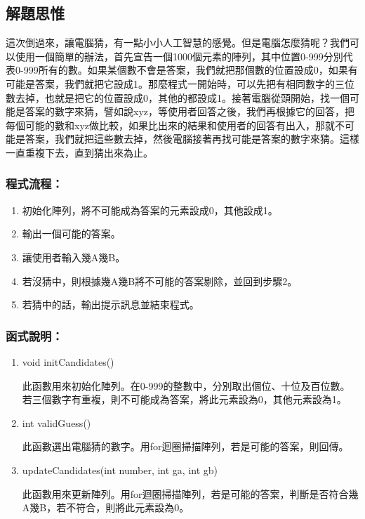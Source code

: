 \documentclass[12pt,a4paper]{article}
\begin{document}
\subsection{解題思惟}
這次倒過來，讓電腦猜，有一點小小人工智慧的感覺。但是電腦怎麼猜呢？我們可以使用一個簡單的辦法，首先宣告一個1000個元素的陣列，其中位置0-999分別代表0-999所有的數。如果某個數不會是答案，我們就把那個數的位置設成0，如果有可能是答案，我們就把它設成1。那麼程式一開始時，可以先把有相同數字的三位數去掉，也就是把它的位置設成0，其他的都設成1。接著電腦從頭開始，找一個可能是答案的數字來猜，譬如說xyz，等使用者回答之後，我們再根據它的回答，把每個可能的數和xyz做比較，如果比出來的結果和使用者的回答有出入，那就不可能是答案，我們就把這些數去掉，然後電腦接著再找可能是答案的數字來猜。這樣一直重複下去，直到猜出來為止。
\subsubsection{程式流程：}
\begin{enumerate}
	\item 初始化陣列，將不可能成為答案的元素設成0，其他設成1。
	\item 輸出一個可能的答案。
	\item 讓使用者輸入幾A幾B。
	\item 若沒猜中，則根據幾A幾B將不可能的答案剔除，並回到步驟2。
	\item 若猜中的話，輸出提示訊息並結束程式。
\end{enumerate}

\subsubsection{函式說明：}
\begin{enumerate}
	\item void initCandidates()
	
	此函數用來初始化陣列。在0-999的整數中，分別取出個位、十位及百位數。若三個數字有重複，則不可能成為答案，將此元素設為0，其他元素設為1。
	
	\item int validGuess()
	
	此函數選出電腦猜的數字。用for迴圈掃描陣列，若是可能的答案，則回傳。
	
	\item updateCandidates(int number, int ga, int gb)
	
	此函數用來更新陣列。用for迴圈掃描陣列，若是可能的答案，判斷是否符合幾A幾B，若不符合，則將此元素設為0。
\end{enumerate}
\end{document}
